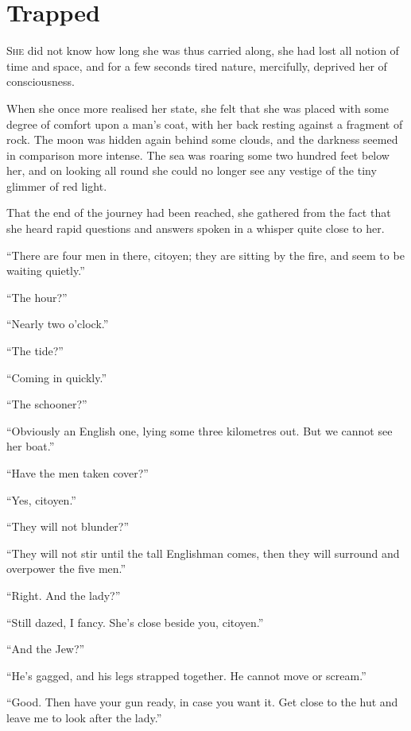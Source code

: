 
\chapter{Trapped}
\lettrine[lines=4]{S}{he} did not know how long she was thus carried along, she had lost all notion of time and space, and for a few seconds tired nature, mercifully, deprived her of consciousness.

When she once more realised her state, she felt that she was placed with some degree of comfort upon a man's coat, with her back resting against a fragment of rock. The moon was hidden again behind some clouds, and the darkness seemed in comparison more intense. The sea was roaring some two hundred feet below her, and on looking all round she could no longer see any vestige of the tiny glimmer of red light.

That the end of the journey had been reached, she gathered from the fact that she heard rapid questions and answers spoken in a whisper quite close to her.

\enquote{There are four men in there, citoyen; they are sitting by the fire, and seem to be waiting quietly.}

\enquote{The hour?}

\enquote{Nearly two o'clock.}

\enquote{The tide?}

\enquote{Coming in quickly.}

\enquote{The schooner?}

\enquote{Obviously an English one, lying some three kilometres out. But we cannot see her boat.}

\enquote{Have the men taken cover?}

\enquote{Yes, citoyen.}

\enquote{They will not blunder?}

\enquote{They will not stir until the tall Englishman comes, then they will surround and overpower the five men.}

\enquote{Right. And the lady?}

\enquote{Still dazed, I fancy. She's close beside you, citoyen.}

\enquote{And the Jew?}

\enquote{He's gagged, and his legs strapped together. He cannot move or scream.}

\enquote{Good. Then have your gun ready, in case you want it. Get close to the hut and leave me to look after the lady.}

